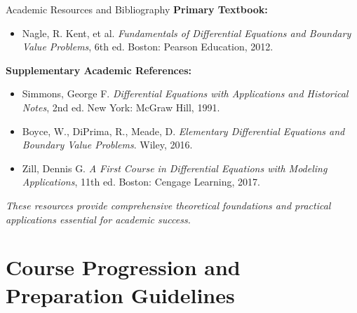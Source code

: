 \documentclass[10pt,aspectratio=169]{beamer}
\newcommand{\concept}[1]{\textcolor{mDarkTeal}{\textbf{#1}}}
\newcommand{\emphasis}[1]{\textit{#1}}
\begin{document}
\begin{frame}{Academic Resources and Bibliography}
    \concept{Primary Textbook:}
    \begin{itemize}
        \item Nagle, R. Kent, et al. \textit{Fundamentals of Differential Equations and Boundary Value Problems}, 6th ed. Boston: Pearson Education, 2012.
    \end{itemize}
    
    \vspace{0.3cm}
    
    \concept{Supplementary Academic References:}
    \begin{itemize}
        \item Simmons, George F. \textit{Differential Equations with Applications and Historical Notes}, 2nd ed. New York: McGraw Hill, 1991.
        \item Boyce, W., DiPrima, R., Meade, D. \textit{Elementary Differential Equations and Boundary Value Problems}. Wiley, 2016.
        \item Zill, Dennis G. \textit{A First Course in Differential Equations with Modeling Applications}, 11th ed. Boston: Cengage Learning, 2017.
    \end{itemize}
    
    \vspace{0.2cm}
    
    \emphasis{These resources provide comprehensive theoretical foundations and practical applications essential for academic success.}
\end{frame}

\section{Course Progression and Preparation Guidelines}
\end{document}
